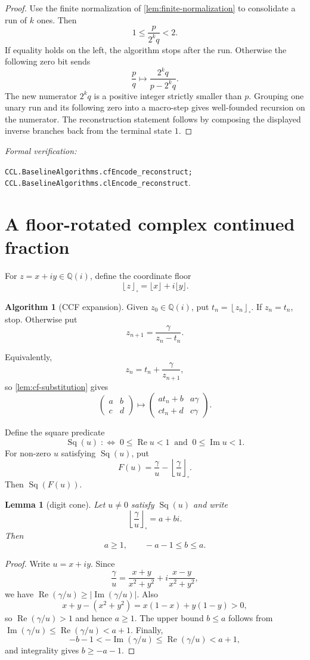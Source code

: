 \documentclass[10pt]{article}
\newtheorem{lemma}[theorem]{Lemma}
\theoremstyle{definition}
\newtheorem{algorithm}[theorem]{Algorithm}
\theoremstyle{remark}
\newcommand{\Qi}{\mathbb{Q}(i)}
\newcommand{\Ree}{\operatorname{Re}}
\newcommand{\Imm}{\operatorname{Im}}
\newcommand{\sqfloor}[1]{\left\lfloor #1\right\rfloor_{\!\square}}
\newcommand{\leanref}[1]{\par\smallskip\noindent
  \emph{Formal verification:}\par\nobreak
  {\raggedright\nolinkurl{#1}.\par}}
\newcommand{\mat}[4]{\begin{pmatrix}#1&#2\\#3&#4\end{pmatrix}}
\begin{document}
\begin{proof}
Use the finite normalization of \autoref{lem:finite-normalization} to consolidate a run of $k$ ones.  Then
\[
 1\le\frac{p}{2^kq}<2.
\]
If equality holds on the left, the algorithm stops after the run.  Otherwise the following zero bit sends
\[
 \frac pq\longmapsto\frac{2^kq}{p-2^kq}.
\]
The new numerator $2^kq$ is a positive integer strictly smaller than $p$.  Grouping one unary run and its following zero into a macro-step gives well-founded recursion on the numerator.  The reconstruction statement follows by composing the displayed inverse branches back from the terminal state $1$.
\end{proof}

\leanref{CCL.BaselineAlgorithms.cfEncode_reconstruct;
CCL.BaselineAlgorithms.clEncode_reconstruct}

\section{A floor-rotated complex continued fraction}

For $z=x+iy\in\Qi$, define the coordinate floor
\[
 \sqfloor{z}=\lfloor x\rfloor+i\lfloor y\rfloor.
\]

\begin{algorithm}[CCF expansion]\label{alg:ccf}
Given $z_0\in\Qi$, put $t_n=\sqfloor{z_n}$.  If $z_n=t_n$, stop.  Otherwise put
\[
 z_{n+1}=\frac{\gamma}{z_n-t_n}.
\]
\end{algorithm}

Equivalently,
\[
 z_n=t_n+\frac{\gamma}{z_{n+1}},
\]
so \autoref{lem:cf-substitution} gives
\[
 \mat{a}{b}{c}{d}
 \longmapsto
 \mat{at_n+b}{a\gamma}{ct_n+d}{c\gamma}.
\]

Define the square predicate
\[
 \operatorname{Sq}(u)\;:\Longleftrightarrow\;
 0\le\Ree u<1\ \text{ and }\ 0\le\Imm u<1.
\]
For non-zero $u$ satisfying $\operatorname{Sq}(u)$, put
\[
 F(u)=\frac{\gamma}{u}-\sqfloor{\frac{\gamma}{u}}.
\]
Then $\operatorname{Sq}(F(u))$.

\begin{lemma}[digit cone]\label{lem:digit-cone}
Let $u\ne0$ satisfy $\operatorname{Sq}(u)$ and write
\[
 \sqfloor{\frac{\gamma}{u}}=a+bi.
\]
Then
\[
 a\ge1,
 \qquad
 -a-1\le b\le a.
\]
\end{lemma}

\begin{proof}
Write $u=x+iy$.  Since
\[
 \frac{\gamma}{u}
 =\frac{x+y}{x^2+y^2}
  +i\frac{x-y}{x^2+y^2},
\]
we have $\Ree(\gamma/u)\ge|\Imm(\gamma/u)|$.  Also
\[
 x+y-(x^2+y^2)=x(1-x)+y(1-y)>0,
\]
so $\Ree(\gamma/u)>1$ and hence $a\ge1$.  The upper bound $b\le a$ follows from $\Imm(\gamma/u)\le\Ree(\gamma/u)<a+1$.  Finally,
\[
 -b-1<-\Imm(\gamma/u)\le\Ree(\gamma/u)<a+1,
\]
and integrality gives $b\ge-a-1$.
\end{proof}
\end{document}
